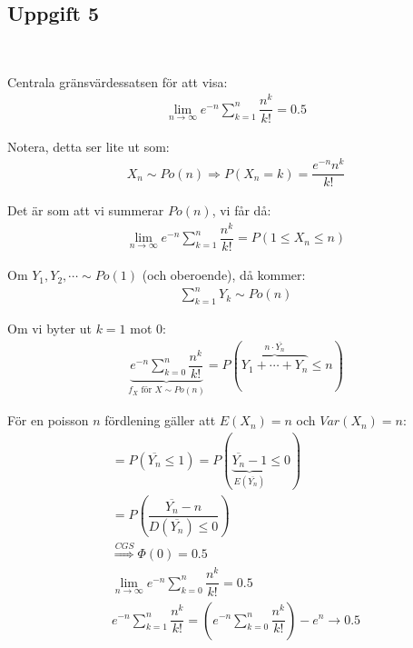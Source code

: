 \subsection{Uppgift 5}\hfill\\\par
\noindent Centrala gränsvärdessatsen för att visa:
\begin{equation*}
  \begin{gathered}
    \lim_{n\to\infty} e^{-n}\sum_{k=1}^{n}\dfrac{n^k}{k!} = 0.5
  \end{gathered}
\end{equation*}\par
\noindent Notera, detta ser lite ut som:
\begin{equation*}
  \begin{gathered}
    X_n\sim Po(n)\Rightarrow P(X_n=k) = \dfrac{e^{-n}n^k}{k!}
  \end{gathered}
\end{equation*}\par
\noindent Det är som att vi summerar $Po(n)$, vi får då:
\begin{equation*}
  \begin{gathered}
    \lim_{n\to\infty} e^{-n}\sum_{k=1}^{n}\dfrac{n^k}{k!} = P(1\leq X_n\leq n)
  \end{gathered}
\end{equation*}\par
\noindent Om $Y_1,Y_2,\cdots\sim Po(1)$ (och oberoende), då kommer:
\begin{equation*}
  \begin{gathered}
    \sum_{k=1}^{n}Y_k \sim Po(n)
  \end{gathered}
\end{equation*}\par
\noindent Om vi byter ut $k=1$ mot 0:
\begin{equation*}
  \begin{gathered}
    \underbrace{e^{-n}\sum_{k=0}^{n}\dfrac{n^k}{k!}}_{\text{$f_X$ för $X\sim Po(n)$}} = P(\overbrace{Y_1+\cdots+Y_n}^{\text{$n\cdot\overline{Y_n}$}}\leq n)
  \end{gathered}
\end{equation*}\par
\noindent För en poisson $n$ fördlening gäller att $E(X_n) = n$ och $Var(X_n)= n$:
\begin{equation*}
  \begin{gathered}
    = P(\overline{Y_n}\leq 1) = P(\underbrace{\overline{Y_n}-1}_{\text{$E(\overline{Y_n})$}}\leq 0)\\
    = P\left(\dfrac{\overline{Y_n}-n}{D(\overline{Y_n})\leq0}\right)\\
    \stackrel{CGS}{\Rightarrow}\Phi(0) = 0.5\\
    \lim_{n\to\infty}e^{-n}\sum_{k=0}^{n}\dfrac{n^k}{k!} = 0.5\\
    e^{-n}\sum_{k=1}^{n}\dfrac{n^k}{k!} = \left(e^{-n}\sum_{k=0}^{n}\dfrac{n^k}{k!}\right)-e^n\to 0.5
  \end{gathered}
\end{equation*}
\par\bigskip
